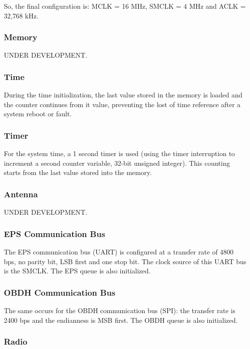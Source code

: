 So, the final configuration is: MCLK = 16 MHz, SMCLK = 4 MHz and ACLK = 32,768 kHz.

\subsubsection{Memory}

UNDER DEVELOPMENT.

\subsubsection{Time}

During the time initialization, the last value stored in the memory is loaded and the counter continues from it value, preventing the lost of time reference after a system reboot or fault.

\subsubsection{Timer}

For the system time, a 1 second timer is used (using the timer interruption to increment a second counter variable, 32-bit unsigned integer). This counting starts from the last value stored into the memory.

\subsubsection{Antenna}

UNDER DEVELOPMENT.

\subsubsection{EPS Communication Bus}

The EPS communication bus (UART) is configured at a transfer rate of 4800 bps, no parity bit, LSB first and one stop bit. The clock source of this UART bus is the SMCLK. The EPS queue is also initialized.

\subsubsection{OBDH Communication Bus}

The same occurs for the OBDH communication bus (SPI): the transfer rate is 2400 bps and the endianness is MSB first. The OBDH queue is also initialized.

\subsubsection{Radio}

